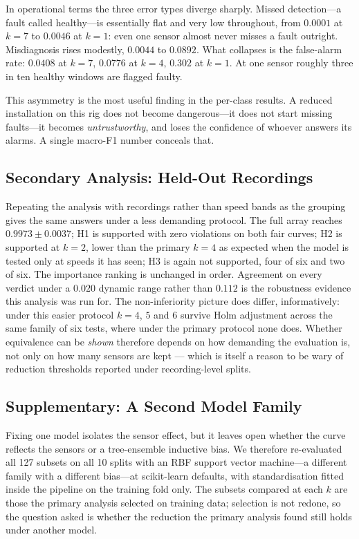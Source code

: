 \documentclass[conference]{IEEEtran}
\begin{document}
In operational terms the three error types diverge sharply. Missed
detection---a fault called healthy---is essentially flat and very low
throughout, from $0.0001$ at $k=7$ to $0.0046$ at $k=1$: even one sensor almost
never misses a fault outright. Misdiagnosis rises modestly, $0.0044$ to
$0.0892$. What collapses is the false-alarm rate: $0.0408$ at $k=7$, $0.0776$
at $k=4$, $0.302$ at $k=1$. At one sensor roughly three in ten healthy windows
are flagged faulty.

This asymmetry is the most useful finding in the per-class results. A reduced
installation on this rig does not become dangerous---it does not start missing
faults---it becomes \emph{untrustworthy}, and loses the confidence of whoever
answers its alarms. A single macro-F1 number conceals that.

\subsection{Secondary Analysis: Held-Out Recordings}
\label{sec:secondary}

Repeating the analysis with recordings rather than speed bands as the grouping
gives the same answers under a less demanding protocol. The full array reaches
$0.9973 \pm 0.0037$; H1 is supported with zero violations on both fair curves;
H2 is supported at $k=2$, lower than the primary $k=4$ as expected when the
model is tested only at speeds it has seen; H3 is again not supported, four of
six and two of six. The importance ranking is unchanged in order. Agreement on
every verdict under a $0.020$ dynamic range rather than $0.112$ is the
robustness evidence this analysis was run for. The non-inferiority picture
does differ, informatively: under this easier protocol $k=4$, $5$ and $6$
survive Holm adjustment across the same family of six tests, where under the
primary protocol none does. Whether equivalence can be \emph{shown} therefore
depends on how demanding the evaluation is, not only on how many sensors are
kept --- which is itself a reason to be wary of reduction thresholds reported
under recording-level splits.

\subsection{Supplementary: A Second Model Family}
\label{sec:svm}

Fixing one model isolates the sensor effect, but it leaves open whether the
curve reflects the sensors or a tree-ensemble inductive bias. We therefore
re-evaluated all 127 subsets on all 10 splits with an RBF support vector
machine---a different family with a different bias---at scikit-learn defaults,
with standardisation fitted inside the pipeline on the training fold only. The
subsets compared at each $k$ are those the primary analysis selected on
training data; selection is not redone, so the question asked is whether the
reduction the primary analysis found still holds under another model.
\end{document}
